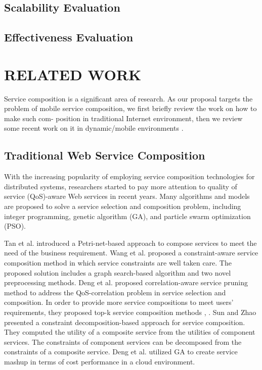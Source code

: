 \documentclass[10pt,journal,compsoc]{IEEEtran}
\begin{document}
\subsection{Scalability Evaluation}
\subsection{Effectiveness Evaluation}

\section{RELATED WORK}
Service composition is a significant area of research. As our proposal targets the problem of mobile service composition, we first briefly review the work on how to make such com- position in traditional Internet environment, then we review some recent work on it in dynamic/mobile environments \cite{Deng2016-2}.

\subsection{Traditional Web Service Composition}
With the increasing popularity of employing service composition technologies for distributed systems, researchers started to pay more attention to quality of service (QoS)-aware Web services in recent years. Many algorithms and models are proposed to solve a service selection and composition problem, including integer programming, genetic algorithm (GA), and particle swarm optimization (PSO).

Tan et al. \cite{tan2010data} introduced a Petri-net-based approach to compose services to meet the need of the business requirement. Wang et al. \cite{wang2014constraint} proposed a constraint-aware service composition method in which service constraints are well taken care. The proposed solution includes a graph search-based algorithm and two novel preprocessing methods. Deng et al. \cite{deng2016service} proposed correlation-aware service pruning method to address the QoS-correlation problem in service selection and composition. In order to provide more service compositions to meet users’ requirements, they proposed top-k service composition methods \cite{}, \cite{}. Sun and Zhao \cite{sun2012decomposition} presented a constraint decomposition-based approach for service composition. They computed the utility of a composite service from the utilities of component services. The constraints of component services can be decomposed from the constraints of a composite service. Deng et al. \cite{} utilized GA to create service mashup in terms of cost performance in a cloud environment.
\end{document}
